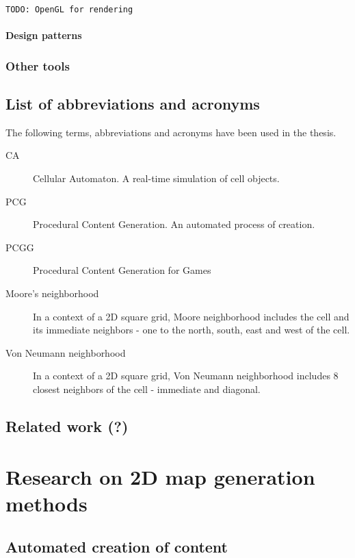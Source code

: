 \documentclass[12pt]{report}
\newcommand{\todo}[1]{}
\renewcommand{\todo}[1]{{\color{red} \par \noindent \footnotesize \texttt{TODO: {#1} }}}
\begin{document}
\todo{OpenGL for rendering}

\subsubsection{Design patterns} 


\subsection{Other tools }

 
\section{List of abbreviations and acronyms} 


The following terms, abbreviations and acronyms have been used in the thesis.

\begin{description}
	\item[CA] Cellular Automaton. A real-time simulation of cell objects.
	\item[PCG] Procedural Content Generation. An automated process of creation.
	\item[PCGG]	Procedural Content Generation for Games
	\item[Moore's neighborhood] In a context of a 2D square grid, Moore neighborhood includes the cell and its immediate neighbors - one to the north, south, east and west of the cell.
	\item[Von Neumann neighborhood] In a context of a 2D square grid, Von Neumann neighborhood includes 8 closest neighbors of the cell - immediate and diagonal.
\end{description}

\section{Related work (?)} 

\chapter{Research on 2D map generation methods} \label{rozdzial.teoria}

\section{ Automated creation of content}
\end{document}
